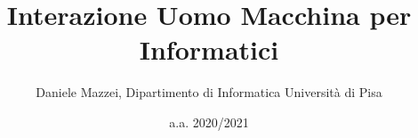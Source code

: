 \documentclass[a4paper,11pt,twoside]{book}
\begin{document}
\title{Interazione Uomo Macchina per Informatici}
\author[1]{Daniele Mazzei, Dipartimento di Informatica Università di Pisa}
\date{a.a. 2020/2021}
\maketitle

\tableofcontents


%
%
%
%
%
\end{document}

